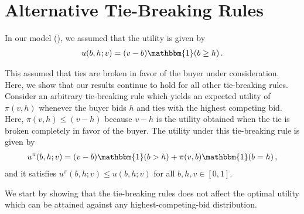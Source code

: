 \section{Alternative Tie-Breaking Rules}\label{appendix:tie-breaking}

In our model (), we assumed that the utility is given by
\begin{align*}
    u(b,h;v) = (v - b) \mathbbm{1}(b \geq h)\,.
\end{align*}

This assumed that ties are broken in favor of the buyer under consideration. Here, we show that our results continue to hold for all other tie-breaking rules. Consider an arbitrary tie-breaking rule which yields an expected utility of $\pi(v,h)$ whenever the buyer bids $h$ and ties with the highest competing bid. Here, $\pi(v,h) \leq (v-h)$ because $v-h$ is the utility obtained when the tie is broken completely in favor of the buyer. The utility under this tie-breaking rule is given by
\begin{align*}
    u^\pi(b,h;v) = (v - b) \mathbbm{1}(b > h) + \pi(v,b) \mathbbm{1}(b = h)\,,
\end{align*}
and it satisfies $u^\pi(b,h;v) \leq u(b,h;v)$ for all $b,h,v \in [0,1]$.

We start by showing that the tie-breaking rules does not affect the optimal utility which can be attained against any highest-competing-bid distribution.

